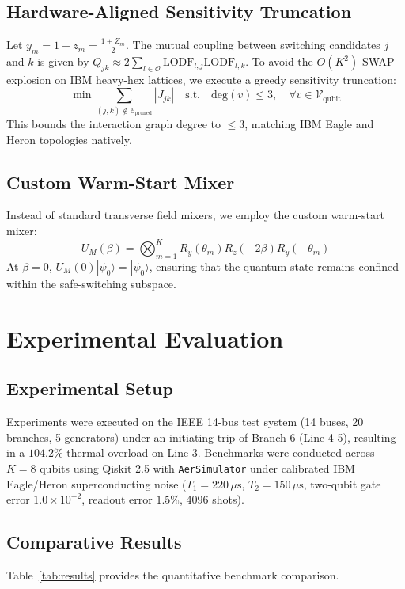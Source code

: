 \documentclass[conference]{IEEEtran}
\begin{document}
\subsection{Hardware-Aligned Sensitivity Truncation}
Let $y_m = 1 - z_m = \frac{1 + Z_m}{2}$. The mutual coupling between switching candidates $j$ and $k$ is given by $Q_{jk} \approx 2 \sum_{l \in \mathcal{O}} \text{LODF}_{l, j} \text{LODF}_{l, k}$.
To avoid the $O(K^2)$ SWAP explosion on IBM heavy-hex lattices, we execute a greedy sensitivity truncation:
\begin{equation}
\min \sum_{(j, k) \notin \mathcal{E}_{\text{pruned}}} |J_{jk}| \quad \text{s.t.} \quad \text{deg}(v) \le 3, \quad \forall v \in \mathcal{V}_{\text{qubit}}
\end{equation}
This bounds the interaction graph degree to $\le 3$, matching IBM Eagle and Heron topologies natively.

\subsection{Custom Warm-Start Mixer}
Instead of standard transverse field mixers, we employ the custom warm-start mixer:
\begin{equation}
U_M(\beta) = \bigotimes_{m=1}^K R_y(\theta_m) R_z(-2\beta) R_y(-\theta_m)
\end{equation}
At $\beta = 0$, $U_M(0)|\psi_0\rangle = |\psi_0\rangle$, ensuring that the quantum state remains confined within the safe-switching subspace.

\section{Experimental Evaluation}

\subsection{Experimental Setup}
Experiments were executed on the IEEE 14-bus test system (14 buses, 20 branches, 5 generators) under an initiating trip of Branch 6 (Line 4-5), resulting in a $104.2\%$ thermal overload on Line 3. Benchmarks were conducted across $K = 8$ qubits using Qiskit 2.5 with \texttt{AerSimulator} under calibrated IBM Eagle/Heron superconducting noise ($T_1 = 220\,\mu\text{s}$, $T_2 = 150\,\mu\text{s}$, two-qubit gate error $1.0 \times 10^{-2}$, readout error $1.5\%$, 4096 shots).

\subsection{Comparative Results}
Table~\ref{tab:results} provides the quantitative benchmark comparison.
\end{document}
